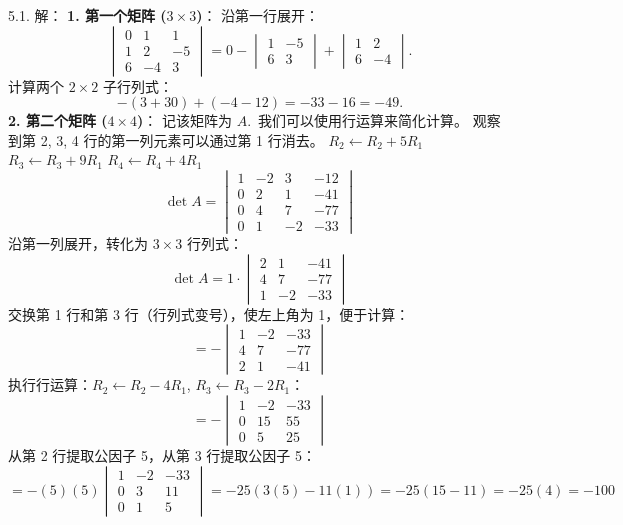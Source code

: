 \begin{exer}
5.1. 解：
\textbf{1. 第一个矩阵 ($3 \times 3$)}：
沿第一行展开：
$$ \begin{vmatrix} 0 & 1 & 1 \\ 1 & 2 & -5 \\ 6 & -4 & 3 \end{vmatrix} = 0 - \begin{vmatrix} 1 & -5 \\ 6 & 3 \end{vmatrix} + \begin{vmatrix} 1 & 2 \\ 6 & -4 \end{vmatrix}. $$
计算两个 $2 \times 2$ 子行列式：
$$ -(3+30)+(-4-12)=-33-16=-49. $$
\textbf{2. 第二个矩阵 ($4 \times 4$)}：
记该矩阵为 $A$.~我们可以使用行运算来简化计算。
观察到第 2, 3, 4 行的第一列元素可以通过第 1 行消去。
$R_2 \leftarrow R_2 + 5R_1$
$R_3 \leftarrow R_3 + 9R_1$
$R_4 \leftarrow R_4 + 4R_1$
$$ \det A = \begin{vmatrix} 1 & -2 & 3 & -12 \\ 0 & 2 & 1 & -41 \\ 0 & 4 & 7 & -77 \\ 0 & 1 & -2 & -33 \end{vmatrix} $$
沿第一列展开，转化为 $3 \times 3$ 行列式：
$$ \det A = 1 \cdot \begin{vmatrix} 2 & 1 & -41 \\ 4 & 7 & -77 \\ 1 & -2 & -33 \end{vmatrix} $$
交换第 1 行和第 3 行（行列式变号），使左上角为 1，便于计算：
$$ = - \begin{vmatrix} 1 & -2 & -33 \\ 4 & 7 & -77 \\ 2 & 1 & -41 \end{vmatrix} $$
执行行运算：$R_2 \leftarrow R_2 - 4R_1$, $R_3 \leftarrow R_3 - 2R_1$：
$$ = - \begin{vmatrix} 1 & -2 & -33 \\ 0 & 15 & 55 \\ 0 & 5 & 25 \end{vmatrix} $$
从第 2 行提取公因子 5，从第 3 行提取公因子 5：
$$ = - (5)(5) \begin{vmatrix} 1 & -2 & -33 \\ 0 & 3 & 11 \\ 0 & 1 & 5 \end{vmatrix} = -25 (3(5) - 11(1)) = -25(15 - 11) = -25(4) = -100 $$


\end{exer}
